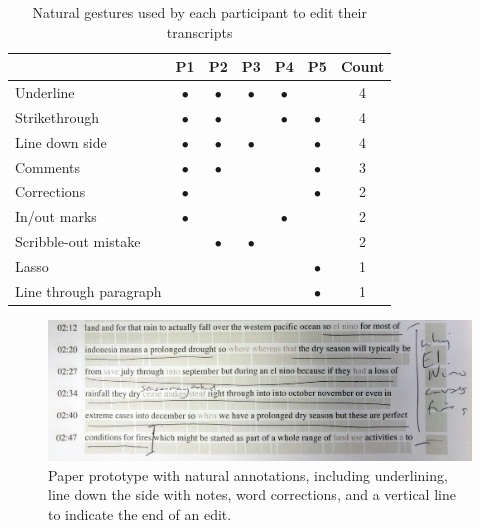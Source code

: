 \begin{table}[ht]
  \centering
  \begin{tabular}{|l|c|c|c|c|c|c|}
    \hline
    & P1        & P2        & P3        & P4        & P5        & Count \\
    \hline
    Underline               & $\bullet$ & $\bullet$ & $\bullet$ & $\bullet$ &           & 4 \\
    \hline
    Strikethrough           & $\bullet$ & $\bullet$ &           & $\bullet$ & $\bullet$ & 4 \\
    \hline
    Line down side          & $\bullet$ & $\bullet$ & $\bullet$ &           & $\bullet$ & 4 \\
    \hline
    Comments                & $\bullet$ & $\bullet$ &           &           & $\bullet$ & 3 \\
    \hline
    Corrections             & $\bullet$ &           &           &           & $\bullet$ & 2 \\
    \hline
    In/out marks            & $\bullet$ &           &           & $\bullet$ &           & 2 \\
    \hline
    Scribble-out mistake    &           & $\bullet$ & $\bullet$ &           &           & 2 \\
    \hline
    Lasso                   &           &           &           &           & $\bullet$ & 1 \\
    \hline
    Line through paragraph  &           &           &           &           & $\bullet$ & 1 \\
    \hline
  \end{tabular}
  \caption{Natural gestures used by each participant to edit their transcripts}
  \label{tab:natural-gestures}
\end{table}

\begin{figure}[h]
  \centering
  \includegraphics[width=\columnwidth]{figs/mockup-cropped}
  \caption{Paper prototype with natural annotations, including
    underlining, line down the side with notes, word corrections, and a
  vertical line to indicate the end of an edit.}
  \label{fig:natural}
\end{figure}

